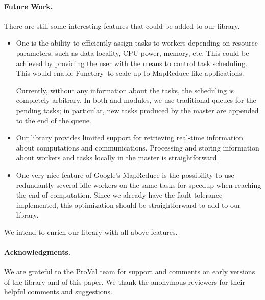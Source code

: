 \documentclass{llncs}
\newcommand{\functory}{\textsf{Functory}}
\begin{document}
\paragraph{Future Work.}
There are still some interesting features that could be added to our
library. 
\begin{itemize}
\item 
  One is the ability to efficiently assign tasks to workers depending
  on resource parameters, such as data locality, CPU power, memory,
  etc. This could be achieved by providing the user with the means to control
  task scheduling.  This would enable \functory\ to scale up to
  MapReduce-like applications.

  Currently, without any information about the tasks, the scheduling
  is completely arbitrary. In both  and 
  modules, we use traditional queues for the pending tasks; in
  particular, new tasks produced by the master are appended to the end
  of the queue.

\item
  Our library provides limited support for retrieving real-time
  information about computations and communications. Processing and storing
  information about workers and tasks locally in the master is
  straightforward.
 
\item 
  One very nice feature of Google's MapReduce is the possibility to
  use redundantly several idle workers on the same tasks
  for speedup when reaching the end of computation.
  Since we already have the fault-tolerance implemented, this
  optimization should be straightforward to add to our library.
\end{itemize}
We intend to enrich our library with all above features.


\paragraph{Acknowledgments.}
We are grateful to the ProVal team for support and comments
on early versions of the library and of this paper.
We thank the anonymous reviewers for their helpful comments and
suggestions.
\end{document}
